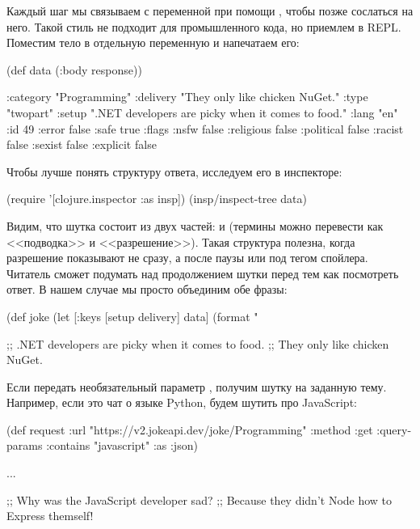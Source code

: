 Каждый шаг мы связываем с переменной при помощи , чтобы позже сослаться на него. Такой стиль не подходит для промышленного кода, но приемлем в REPL. Поместим тело в отдельную переменную и напечатаем его:

\begin{english}
  \begin{clojure}
(def data
  (:body response))

{:category "Programming"
 :delivery "They only like chicken NuGet."
 :type "twopart"
 :setup ".NET developers are picky when it comes to food."
 :lang "en"
 :id 49
 :error false
 :safe true
 :flags
 {:nsfw false
  :religious false
  :political false
  :racist false
  :sexist false
  :explicit false}}
  \end{clojure}
\end{english}

Чтобы лучше понять структуру ответа, исследуем его в инспекторе:

\begin{english}
  \begin{clojure}
(require '[clojure.inspector :as insp])
(insp/inspect-tree data)
  \end{clojure}
\end{english}

Видим, что шутка состоит из двух частей:  и  (термины можно перевести как <<подводка>> и <<разрешение>>). Такая структура полезна, когда разрешение показывают не сразу, а после паузы или под тегом спойлера. Читатель сможет подумать над продолжением шутки перед тем как посмотреть ответ. В нашем случае мы просто объединим обе фразы:

\begin{english}
  \begin{clojure}
(def joke
  (let [{:keys [setup
                delivery]} data]
    (format "%

;; .NET developers are picky when it comes to food.
;; They only like chicken NuGet.
  \end{clojure}
\end{english}

Если передать необязательный параметр , получим шутку на заданную тему. Например, если это чат о языке Python, будем шутить про JavaScript:

\begin{english}
  \begin{clojure}
(def request
  {:url "https://v2.jokeapi.dev/joke/Programming"
   :method :get
   :query-params {:contains "javascript"}
   :as :json})

...

;; Why was the JavaScript developer sad?
;; Because they didn't Node how to Express themself!
  \end{clojure}
\end{english}


